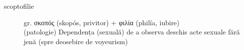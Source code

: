 	\begin{description}
	\item[scoptofilie] gr. \textgreek{σκοπός} (skopós, \dedouble privitor\sqtworight) +‎ \textgreek{φιλία} (philía, \dedouble iubire\sqtworight) \\
	(patologie) Dependența (sexuală) de a observa deschis acte sexuale fără jenă (spre deosebire de voyeurism) \\
\end{description}